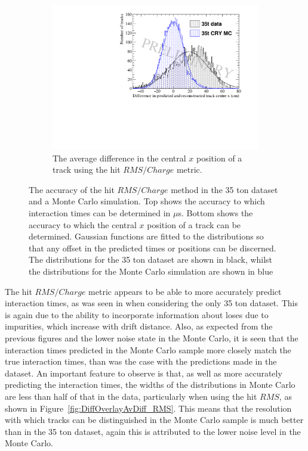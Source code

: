 \begin{figure}[h!]
  \begin{subfigure}{0.6\textwidth}
    \centering
    \includegraphics[width=\textwidth]{Overlay_AvXPosDiff_RMS_Int}
    \caption{The average difference in the central $x$ position of a track using the hit $RMS/Charge$ metric.}
    \label{fig:DiffOverlayAvDiff_RMS_Int_X}
  \end{subfigure}
  \caption[Comparing the accuracy of the hit $RMS$ method in the 35 ton dataset and a Monte Carlo simulation]
          {The accuracy of the hit $RMS/Charge$ method in the 35 ton dataset and a Monte Carlo simulation. Top shows the accuracy to which interaction times can be determined in $\mu$s. Bottom shows the accuracy to which the central $x$ position of a track can be determined. Gaussian functions are fitted to the distributions so that any offset in the predicted times or positions can be discerned. The distributions for the 35 ton dataset are shown in black, whilst the distributions for the Monte Carlo simulation are shown in blue}
  \label{fig:DiffOverlayAvDiff_RMS_Int}
\end{figure}

The hit $RMS/Charge$ metric appears to be able to more accurately predict interaction times, as was seen in when considering the only 35 ton dataset. This is again due to the ability to incorporate information about loses due to impurities, which increase with drift distance. Also, as expected from the previous figures and the lower noise state in the Monte Carlo, it is seen that the interaction times predicted in the Monte Carlo sample more closely match the true interaction times, than was the case with the predictions made in the dataset. An important feature to observe is that, as well as more accurately predicting the interaction times, the widths of the distributions in Monte Carlo are less than half of that in the data, particularly when using the hit $RMS$, as shown in Figure~\ref{fig:DiffOverlayAvDiff_RMS}. This means that the resolution with which tracks can be distinguished in the Monte Carlo sample is much better than in the 35 ton dataset, again this is attributed to the lower noise level in the Monte Carlo. \\

